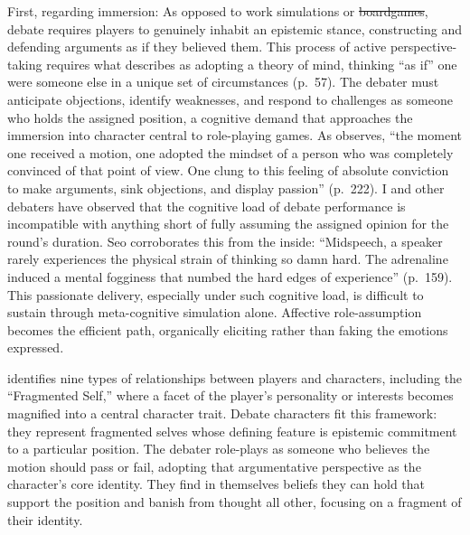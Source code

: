\documentclass[12pt]{article}
\makeatletter
\providecommand{\DIFaddtex}[1]{{\protect\color[rgb]{0,0.5,0}\uwave{#1}}} %
\providecommand{\DIFdeltex}[1]{{\protect\color{red}\sout{#1}}} %
\providecommand{\DIFaddbegin}{} %
\providecommand{\DIFaddend}{} %
\providecommand{\DIFdelbegin}{} %
\providecommand{\DIFdelend}{} %
\providecommand{\DIFadd}[1]{\texorpdfstring{\DIFaddtex{#1}}{#1}} %
\providecommand{\DIFdel}[1]{\texorpdfstring{\DIFdeltex{#1}}{}} %
\providecommand{\DIFscaledelfig}{0.5}
\newlength{\DIFdelgraphicswidth} %
\newlength{\DIFdelgraphicsheight} %
\providecommand{\DIFaddincludegraphics}[2][]{{\color[rgb]{0,0.5,0}\fbox{\DIFOincludegraphics[#1]{#2}}}} %
\providecommand{\DIFdelincludegraphics}[2][]{%
\sbox{\DIFdelgraphicsbox}{\DIFOincludegraphics[#1]{#2}}%
\settoboxwidth{\DIFdelgraphicswidth}{\DIFdelgraphicsbox} %
\settoboxtotalheight{\DIFdelgraphicsheight}{\DIFdelgraphicsbox} %
\scalebox{\DIFscaledelfig}{%
\parbox[b]{\DIFdelgraphicswidth}{\usebox{\DIFdelgraphicsbox}\\[-\baselineskip] \rule{\DIFdelgraphicswidth}{0em}}\llap{\resizebox{\DIFdelgraphicswidth}{\DIFdelgraphicsheight}{%
\setlength{\unitlength}{\DIFdelgraphicswidth}%
\begin{picture}(1,1)%
\thicklines\linethickness{2pt} %
{\color[rgb]{1,0,0}\put(0,0){\framebox(1,1){}}}%
{\color[rgb]{1,0,0}\put(0,0){\line( 1,1){1}}}%
{\color[rgb]{1,0,0}\put(0,1){\line(1,-1){1}}}%
\end{picture}%
}\hspace*{3pt}}} %
} %
\DeclareRobustCommand{\DIFaddbegin}{\DIFOaddbegin \let\includegraphics\DIFaddincludegraphics} %
\DeclareRobustCommand{\DIFaddend}{\DIFOaddend \let\includegraphics\DIFOincludegraphics} %
\DeclareRobustCommand{\DIFdelbegin}{\DIFOdelbegin \let\includegraphics\DIFdelincludegraphics} %
\DeclareRobustCommand{\DIFdelend}{\DIFOaddend \let\includegraphics\DIFOincludegraphics} %
\let\sout@orig\sout %
\renewcommand{\sout}[1]{\ifmmode\text{\sout@orig{\ensuremath{#1}}}\else\sout@orig{#1}\fi} %
\makeatother
\begin{document}
First, regarding immersion: As opposed to work simulations or \DIFdelbegin \DIFdel{boardgames}\DIFdelend \DIFaddbegin \DIFadd{board games}\DIFaddend , debate requires players to genuinely inhabit an epistemic stance, constructing and defending arguments as if they believed them. This process of active perspective-taking requires what \textcite{bowman2010functions} describes as adopting a theory of mind, thinking ``as if'' one were someone else in a unique set of circumstances (p.~57). The debater must anticipate objections, identify weaknesses, and respond to challenges as someone who holds the assigned position, a cognitive demand that approaches the immersion into character central to role-playing games. As \textcite{seo2022good} observes, ``the moment one received a motion, one adopted the mindset of a person who was completely convinced of that point of view. One clung to this feeling of absolute conviction to make arguments, sink objections, and display passion'' (p.~222). I and other debaters have observed that the cognitive load of debate performance is incompatible with anything short of fully assuming the assigned opinion for the round's duration. Seo corroborates this from the inside: ``Midspeech, a speaker rarely experiences the physical strain of thinking so damn hard. The adrenaline induced a mental fogginess that numbed the hard edges of experience'' (p.~159). This passionate delivery, especially under such cognitive load, is difficult to sustain through meta-cognitive simulation alone. Affective role-assumption becomes the efficient path, organically eliciting rather than faking the emotions expressed.

\textcite{bowman2010functions} identifies nine types of relationships between players and characters, including the ``Fragmented Self,'' where a facet of the player's personality or interests becomes magnified into a central character trait. Debate characters fit this framework: they represent fragmented selves whose defining feature is epistemic commitment to a particular position. The debater role-plays as someone who believes the motion should pass or fail, adopting that argumentative perspective as the character's core identity. They find in themselves beliefs they can hold that support the position and banish from thought all other, focusing on a fragment of their identity.
\end{document}
